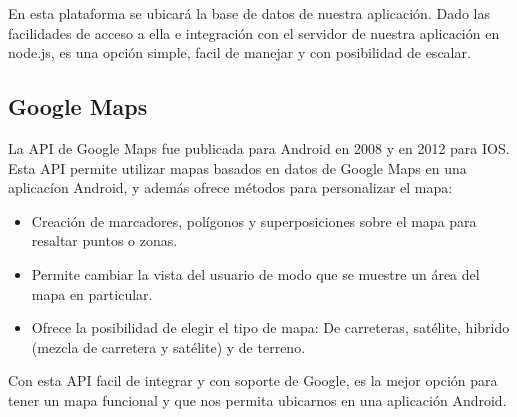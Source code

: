 En esta plataforma se ubicará la base de datos de nuestra aplicación. Dado las facilidades de acceso a ella e integración con el servidor de nuestra aplicación en node.js, es una opción simple, facil de manejar y con posibilidad de escalar.

\subsection{ Google Maps }

La API de Google Maps \cite{URL::GoogleMapsApi} fue publicada para Android en 2008 y en 2012 para IOS. Esta API permite utilizar mapas basados en datos de Google Maps en una aplicacíon Android, y además ofrece métodos para personalizar el mapa:
\begin{itemize}
	\item Creación de marcadores, polígonos y superposiciones sobre el mapa para resaltar puntos o zonas. 
	\item Permite cambiar la vista del usuario de modo que se muestre un área del mapa en particular. 
	\item Ofrece la posibilidad de elegir el tipo de mapa: De carreteras, satélite, hibrido (mezcla de carretera y satélite) y de terreno.
\end{itemize}

Con esta API facil de integrar y con soporte de Google, es la mejor opción para tener un mapa funcional y que nos permita ubicarnos en una aplicación Android.
